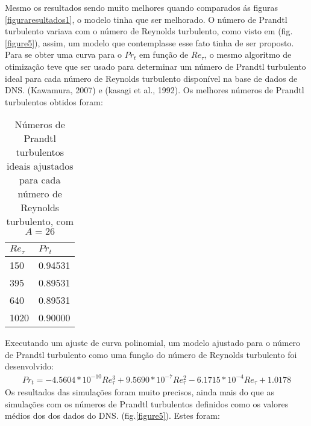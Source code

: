Mesmo os resultados sendo muito melhores quando comparados ás figuras \ref{figuraresultados1}, o modelo tinha que ser melhorado. O número de Prandtl turbulento variava com o número de Reynolds turbulento, como visto em (fig.\ref{figure5}), assim, um modelo que contemplasse esse fato tinha de ser proposto. 
Para se obter uma curva para o $Pr_t$ em função de $Re_\tau$, o mesmo algoritmo de otimização teve que ser usado para determinar um número de Prandtl turbulento ideal para cada número de Reynolds turbulento disponível na base de dados de DNS. (Kawamura, 2007) e (kasagi et al., 1992).
Os melhores números de Prandtl turbulentos obtidos foram:

\begin{table}[!h]
	\centering
	\caption{Números de Prandtl turbulentos ideais ajustados para cada número de Reynolds turbulento, com $A = 26$}
	\begin{tabular}{ll}
		\hline
		$Re_\tau$ & $Pr_t$\\
		\hline
		150  &   0.94531\\
		395  &   0.89531\\
		640  &   0.89531\\
		1020 &   0.90000\\ 
		\hline
	\end{tabular}
\end{table}



Executando um ajuste de curva polinomial, um modelo ajustado para o número de Prandtl turbulento como uma função do número de Reynolds turbulento foi desenvolvido:
\begin{equation}
\begin{split}
Pr_t = -4.5604 * 10^{-10} Re_\tau^3 + 9.5690 * 10^{-7} Re_\tau^2 - 6.1715 *10 ^{-4} Re_\tau + 1.0178 
\end{split}
\end{equation}
Os resultados das simulações foram muito precisos, ainda mais do que as simulações com os números de Prandtl turbulentos definidos como os valores médios dos dos dados do DNS. (fig.\ref{figure5}). Estes foram:




